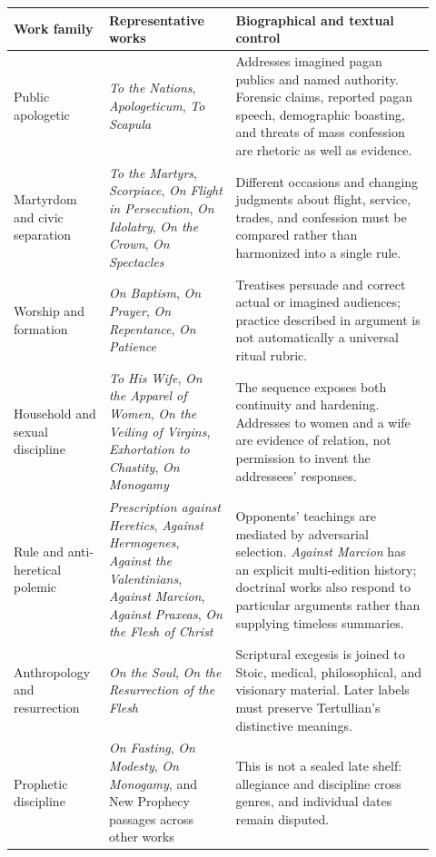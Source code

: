 \begingroup
\small
\setlength{\tabcolsep}{4pt}
\begin{longtable}{>{\raggedright\arraybackslash}p{0.20\linewidth}
                  >{\raggedright\arraybackslash}p{0.28\linewidth}
                  >{\raggedright\arraybackslash}p{0.44\linewidth}}
\toprule
\textbf{Work family} & \textbf{Representative works} &
\textbf{Biographical and textual control}\\
\midrule
\endhead
Public apologetic & \emph{To the Nations}, \emph{Apologeticum}, \emph{To
Scapula} & Addresses imagined pagan publics and named authority. Forensic
claims, reported pagan speech, demographic boasting, and threats of mass
confession are rhetoric as well as evidence.\\
Martyrdom and civic separation & \emph{To the Martyrs}, \emph{Scorpiace},
\emph{On Flight in Persecution}, \emph{On Idolatry}, \emph{On the Crown},
\emph{On Spectacles} & Different occasions and changing judgments about flight,
service, trades, and confession must be compared rather than harmonized into a
single rule.\\
Worship and formation & \emph{On Baptism}, \emph{On Prayer}, \emph{On
Repentance}, \emph{On Patience} & Treatises persuade and correct actual or
imagined audiences; practice described in argument is not automatically a
universal ritual rubric.\\
Household and sexual discipline & \emph{To His Wife}, \emph{On the Apparel of
Women}, \emph{On the Veiling of Virgins}, \emph{Exhortation to Chastity},
\emph{On Monogamy} & The sequence exposes both continuity and hardening.
Addresses to women and a wife are evidence of relation, not permission to
invent the addressees' responses.\\
Rule and anti-heretical polemic & \emph{Prescription against Heretics},
\emph{Against Hermogenes}, \emph{Against the Valentinians}, \emph{Against
Marcion}, \emph{Against Praxeas}, \emph{On the Flesh of Christ} & Opponents'
teachings are mediated by adversarial selection. \emph{Against Marcion} has an
explicit multi-edition history; doctrinal works also respond to particular
arguments rather than supplying timeless summaries.\\
Anthropology and resurrection & \emph{On the Soul}, \emph{On the Resurrection
of the Flesh} & Scriptural exegesis is joined to Stoic, medical, philosophical,
and visionary material. Later labels must preserve Tertullian's distinctive
meanings.\\
Prophetic discipline & \emph{On Fasting}, \emph{On Modesty}, \emph{On
Monogamy}, and New Prophecy passages across other works & This is not a sealed
late shelf: allegiance and discipline cross genres, and individual dates remain
disputed.\\
\bottomrule
\end{longtable}
\endgroup

